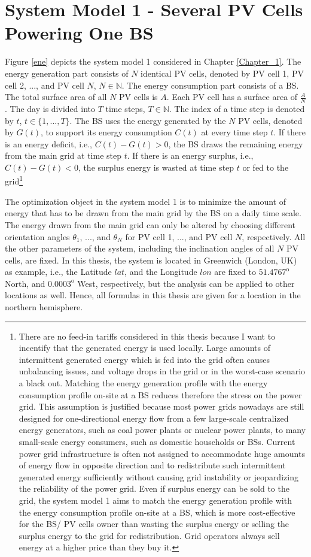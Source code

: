 \section{System Model 1 - Several PV Cells Powering One BS\label{system_1}}
Figure \ref{ene} depicts the system model 1 considered in Chapter \ref{Chapter_1}. The energy generation part consists of $N$ identical PV cells, denoted by PV cell 1, PV cell 2, ..., and PV cell $N$, $N \in \mathbb{N}$. The energy consumption part consists of a BS. The total surface area of all $N$ PV cells is $A$. Each PV cell has a surface area of $\frac{A}{N}$. The day is divided into $T$ time steps, $T\in\mathbb{N}$. The index of a time step is denoted by $t$, $t \in \{1,...,T\}$.
The BS uses the energy generated by the $N$ PV cells, denoted by $G(t)$, to support its energy consumption $C(t)$ at every time step $t$. 
If there is an energy deficit, i.e., $C(t)-G(t)>0$, the BS draws the remaining energy from the main grid at time step $t$. If there is an energy surplus, i.e., $C(t)-G(t)<0$, the surplus energy is wasted at time step $t$ or fed to the grid\footnote{There are no feed-in tariffs considered in this thesis because I want to incentify that the generated energy is used locally. Large amounts of intermittent generated energy which is fed into the grid often causes unbalancing issues, and voltage drops in the grid or in the worst-case scenario a black out. Matching the energy generation profile with the energy consumption profile on-site at a BS reduces therefore the stress on the power grid. This assumption is justified because most power grids nowadays are still designed for one-directional energy flow from a few large-scale centralized energy generators, such as coal power plants or nuclear power plants, to many small-scale energy consumers, such as domestic households or BSs. Current power grid infrastructure is often not assigned to accommodate huge amounts of energy flow in opposite direction and to redistribute such intermittent generated energy sufficiently without causing grid instability or jeopardizing the reliability of the power grid. Even if surplus energy can be sold to the grid, the system model 1 aims to match the energy generation profile with the energy consumption profile on-site at a BS, which is more cost-effective for the BS/ PV cells owner than wasting the surplus energy or selling the surplus energy to the grid for redistribution. Grid  operators always sell energy at a higher price than they buy it.}


The optimization object in the system model 1 is to minimize the amount of energy that has to be drawn from the main grid by the BS on a daily time scale. The energy drawn from the main grid can only be altered by choosing different orientation angles $\theta_1$, ..., and $\theta_N$ for PV cell 1, ..., and PV cell $N$, respectively. All the other parameters of the system, including the inclination angles of all $N$ PV cells, are fixed. In this thesis, the system is located in Greenwich (London, UK) as example, i.e., the Latitude $lat$, and the Longitude $lon$ are fixed to $51.4767^{\mathrm{o}}$ North, and $0.0003^{\mathrm{o}}$ West, respectively, but the analysis can be applied to other locations as well. Hence, all formulas in this thesis are given for a location in the northern hemisphere.


